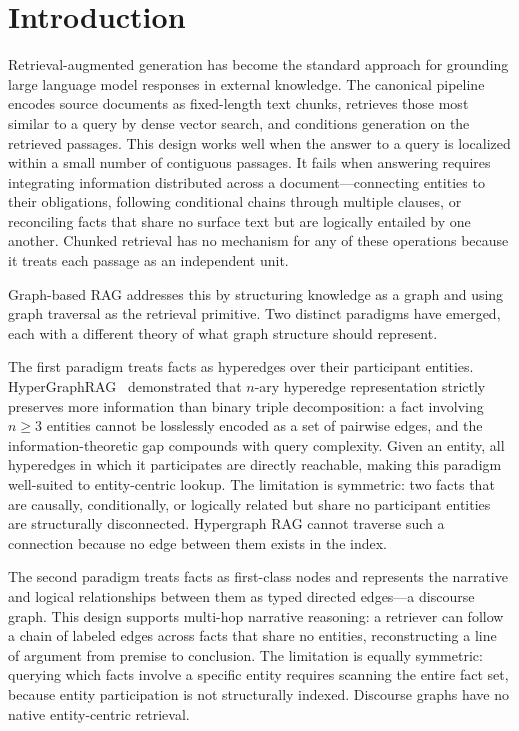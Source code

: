 \documentclass[runningheads]{llncs}
\begin{document}
\section{Introduction}

Retrieval-augmented generation has become the standard approach for grounding large language
model responses in external knowledge. The canonical pipeline encodes source documents as
fixed-length text chunks, retrieves those most similar to a query by dense vector search,
and conditions generation on the retrieved passages. This design works well when the answer
to a query is localized within a small number of contiguous passages. It fails when answering
requires integrating information distributed across a document---connecting entities to their
obligations, following conditional chains through multiple clauses, or reconciling facts that
share no surface text but are logically entailed by one another. Chunked retrieval has no
mechanism for any of these operations because it treats each passage as an independent unit.

Graph-based RAG addresses this by structuring knowledge as a graph and using graph traversal
as the retrieval primitive. Two distinct paradigms have emerged, each with a different theory
of what graph structure should represent.

The first paradigm treats facts as hyperedges over their participant entities.
HyperGraphRAG~\cite{luo2025hypergraphrag} demonstrated that $n$-ary hyperedge representation
strictly preserves more information than binary triple decomposition: a fact involving
$n \geq 3$ entities cannot be losslessly encoded as a set of pairwise edges, and the
information-theoretic gap compounds with query complexity. Given an entity, all hyperedges
in which it participates are directly reachable, making this paradigm well-suited to
entity-centric lookup. The limitation is symmetric: two facts that are causally,
conditionally, or logically related but share no participant entities are structurally
disconnected. Hypergraph RAG cannot traverse such a connection because no edge between
them exists in the index.

The second paradigm treats facts as first-class nodes and represents the narrative and
logical relationships between them as typed directed edges---a discourse graph. This design
supports multi-hop narrative reasoning: a retriever can follow a chain of labeled edges
across facts that share no entities, reconstructing a line of argument from premise to
conclusion. The limitation is equally symmetric: querying which facts involve a specific
entity requires scanning the entire fact set, because entity participation is not
structurally indexed. Discourse graphs have no native entity-centric retrieval.
\end{document}
